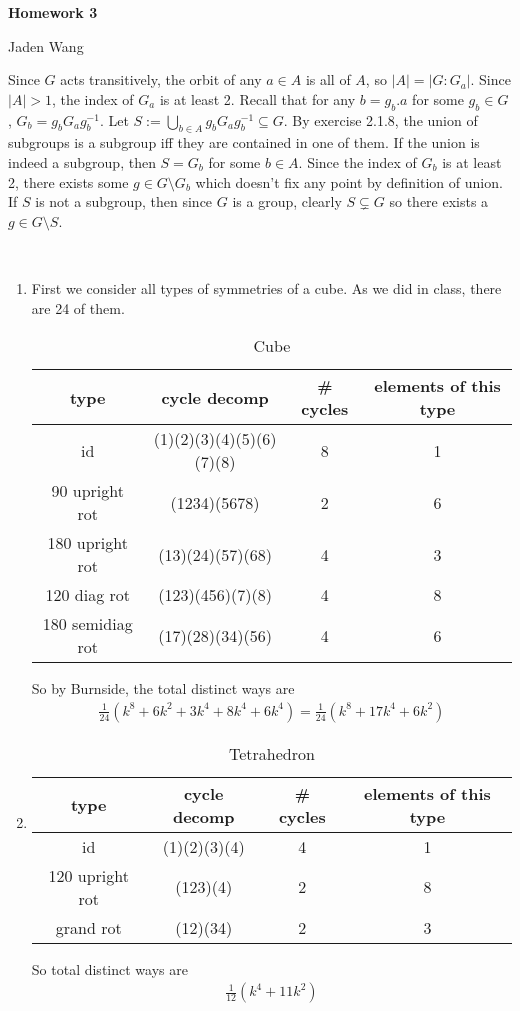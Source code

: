 \documentclass[12pt]{article}
\begin{document}
\centerline {\textsf{\textbf{\LARGE{Homework 3}}}}
\centerline {Jaden Wang}
\vspace{.15in}
\begin{problem}[1]
Since $ G$ acts transitively, the orbit of any  $ a \in A$ is all of $ A$, so  $ |A| = |G:G_a|$. Since  $ |A|>1$, the index of  $ G_a$ is at least 2. Recall that for any $ b=g_b.a$ for some $ g_b \in G$, $ G_b = g_b G_a g_b^{-1}$. Let $S := \bigcup_{ b \in A} g_b G_a g_b ^{-1} \subseteq G$. By exercise 2.1.8, the union of subgroups is a subgroup iff they are contained in one of them. If the union is indeed a subgroup, then $S= G_b$ for some  $ b \in A$. Since the index of $ G_b$ is at least 2, there exists some  $ g \in G \setminus G_b$ which doesn't fix any point by definition of union. If $ S$ is not a subgroup, then since  $ G$ is a group, clearly  $ S \subsetneq G$ so there exists a $ g \in G\setminus S$.
\end{problem}
\begin{problem}[2]
~\begin{enumerate}[label=(\alph*)]
	\item First we consider all types of symmetries of a cube. As we did in class, there are 24 of them.
		\begin{table}[H]
			\centering
			\caption{Cube}
			\begin{tabular}{c|c|c|c}
				type& cycle decomp & \# cycles & elements of this type\\
				\hline
				\hline
				id&(1)(2)(3)(4)(5)(6)(7)(8)&8&1\\
				\hline
				90 upright rot & (1234)(5678)&2& 6\\
				\hline
				180 upright rot & (13)(24)(57)(68)&4&3 \\
				\hline
				120 diag rot & (123)(456)(7)(8)&4&8\\
				\hline
				180 semidiag rot & (17)(28)(34)(56)&4&6
			\end{tabular}
		\end{table}
		So by Burnside, the total distinct ways are
		\begin{align*}
			\frac{1}{24}(k^{8}+6k^2 + 3 k^{4}+8k^{4}+6k^{4}) = \frac{1}{24} (k^{8}+ 17k^{4}+6k^2)
		\end{align*}
	\item 
		\begin{table}[H]
			\centering
			\caption{Tetrahedron}
			\begin{tabular}{c|c|c|c}
				type& cycle decomp & \# cycles & elements of this type\\
				\hline
				\hline
				id&(1)(2)(3)(4)&4&1\\
				\hline
				120 upright rot & (123)(4)&2& 8\\
				\hline
				grand rot & (12)(34)&2& 3\\
			\end{tabular}
		\end{table}
		So total distinct ways are
		\begin{align*}
			\frac{1}{12} (k^{4}+11k^{2})
		\end{align*}
\end{enumerate}
\end{problem}
\end{document}
